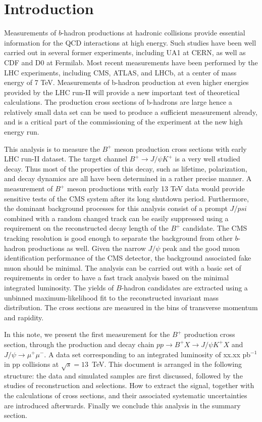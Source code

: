 \section{Introduction}
\label{sec:introduction}


Measurements of $b$-hadron productions at hadronic collisions provide essential information for the
QCD interactions at high energy.  Such studies have been well carried out in several former experiments, including UA1 at CERN, as well as CDF and D0 at Fermilab. Most recent measurements have been performed by the LHC experiments, including CMS, ATLAS, and LHCb, at a center of mass energy of 7 TeV. Measurements of b-hadron production at even higher energies provided by the LHC run-II will provide a new important test of theoretical calculations. The production cross sections of b-hadrons are large hence a relatively small data set can be used to produce a sufficient measurement already, and is a critical part of the commissioning of the experiment at the new high energy run. 

This analysis is to measure the $B^+$ meson production cross sections with early LHC run-II dataset. The target channel 
$B^+ \to J/\psi K^+$ is a very well studied decay. Thus most of the properties of this decay, such as lifetime, polarization, and decay dynamics are 
all have been determined in a rather precise manner. A measurement of $B^+$ meson productions with early 13 TeV data would provide sensitive tests of the CMS system after its long shutdown period. Furthermore, the dominant background processes for this analysis consist of a 
prompt $J/psi$ combined with a random changed track can be easily suppressed using a requirement on the reconstructed decay length of the $B^+$ candidate. The CMS tracking resolution is good enough to separate the background from other $b$-hadron productions as well. Given the narrow $J/\psi$ peak and the good muon identification performance of the CMS detector, the background associated fake muon should be minimal.
The analysis can be carried out with a basic set of requirements in order to have a fast track analysis based on the minimal integrated 
luminosity.
The yields of $B$-hadron candidates are extracted using a unbinned maximum-likelihood fit to the reconstructed invariant mass distribution.
The cross sections are measured in the bins of transverse momentum and rapidity. 

In this note, we present the first measurement for the $B^+$ production cross section, through the production and decay chain $pp \to B^+X \to J/\psi K^+ X$ and $J/\psi \to \mu^+\mu^-$. A data set corresponding to an integrated luminosity of xx.xx pb$^{-1}$ in pp collisions at $\sqrt{s} = 13$~TeV. This document is arranged in the following structure: the data and simulated samples are first discussed, followed by the studies of reconstruction and selections. How to extract the signal, together with the calculations of cross sections, and their associated systematic uncertainties are introduced afterwards. Finally we conclude this analysis in the summary section.


